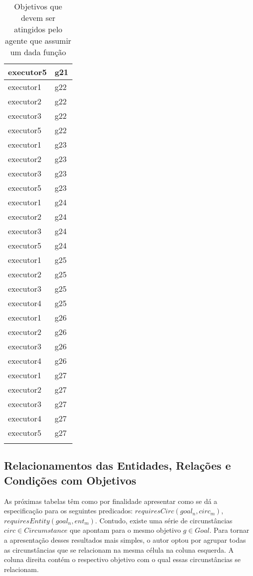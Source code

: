\begin{center}
\begin{longtable}[H]{|l|l|}
executor5 & g21 \\ \hline
executor1 & g22 \\ \hline
executor2 & g22 \\ \hline
executor3 & g22 \\ \hline
executor5 & g22 \\ \hline
executor1 & g23 \\ \hline
executor2 & g23 \\ \hline
executor3 & g23 \\ \hline
executor5 & g23 \\ \hline
executor1 & g24 \\ \hline
executor2 & g24 \\ \hline
executor3 & g24 \\ \hline
executor5 & g24 \\ \hline
executor1 & g25 \\ \hline
executor2 & g25 \\ \hline
executor3 & g25 \\ \hline
executor4 & g25 \\ \hline
executor1 & g26 \\ \hline
executor2 & g26 \\ \hline
executor3 & g26 \\ \hline
executor4 & g26 \\ \hline
executor1 & g27 \\ \hline
executor2 & g27 \\ \hline
executor3 & g27 \\ \hline
executor4 & g27 \\ \hline
executor5 & g27 \\ \hline
\caption{Objetivos que devem ser atingidos pelo agente que assumir um dada função}
\label{deontic1}
\end{longtable}
\end{center}

\subsection{Relacionamentos das Entidades, Relações e Condições com Objetivos}

As próximas tabelas têm como por finalidade apresentar como se dá a especificação para os seguintes predicados: $requiresCirc(goal_n, circ_m)$,$requiresEntity(goal_n, ent_m)$. Contudo, existe uma série de circunstâncias $circ \in Circumstance$ que apontam para o mesmo objetivo $g \in Goal$. Para tornar a apresentação desses resultados mais simples, o autor optou por agrupar todas as circunstâncias que se relacionam na mesma célula na coluna esquerda. A coluna direita contém o respectivo objetivo com o qual essas circunstâncias se relacionam.

